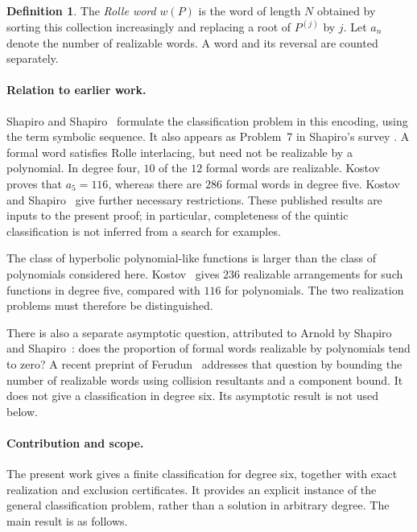 \documentclass[11pt]{article}
\theoremstyle{definition}
\newtheorem{definition}[theorem]{Definition}
\begin{document}
\begin{definition}
The \emph{Rolle word} $w(P)$ is the word of length $N$ obtained by sorting
this collection increasingly and replacing a root of $P^{(j)}$ by $j$.
Let $a_n$ denote the number of realizable words. A word and its reversal
are counted separately.
\end{definition}

\paragraph{Relation to earlier work.}
Shapiro and Shapiro~\cite[Section~2]{ShapiroShapiro2012} formulate the
classification problem in this encoding, using the term symbolic
sequence. It also appears as Problem~7 in Shapiro's survey
\cite{Shapiro2015}. A formal word satisfies Rolle interlacing, but need
not be realizable by a polynomial. In degree four, $10$ of the $12$
formal words are realizable. Kostov~\cite[Theorem~2]{Kostov2002} proves
that $a_5=116$, whereas there are $286$ formal words in degree five.
Kostov and Shapiro~\cite{KostovShapiro2002} give further necessary
restrictions. These published results are inputs to the present proof;
in particular, completeness of the quintic classification is not inferred
from a search for examples.

The class of hyperbolic polynomial-like functions is larger than the
class of polynomials considered here. Kostov~\cite{Kostov2007} gives
$236$ realizable arrangements for such functions in degree five,
compared with $116$ for polynomials. The two realization problems must
therefore be distinguished.

There is also a separate asymptotic question, attributed to Arnold by
Shapiro and Shapiro~\cite[Section~2, Problem~1]{ShapiroShapiro2012}:
does the proportion of formal words realizable by polynomials tend to
zero? A recent preprint of Ferudun~\cite{Ferudun2026} addresses that
question by bounding the number of realizable words using
collision resultants and a component bound. It does not give a
classification in degree six. Its asymptotic result is not used below.

\paragraph{Contribution and scope.}
The present work gives a finite classification for degree six, together
with exact realization and exclusion certificates. It provides an
explicit instance of the general classification problem, rather than a
solution in arbitrary degree. The main result is as follows.
\end{document}
